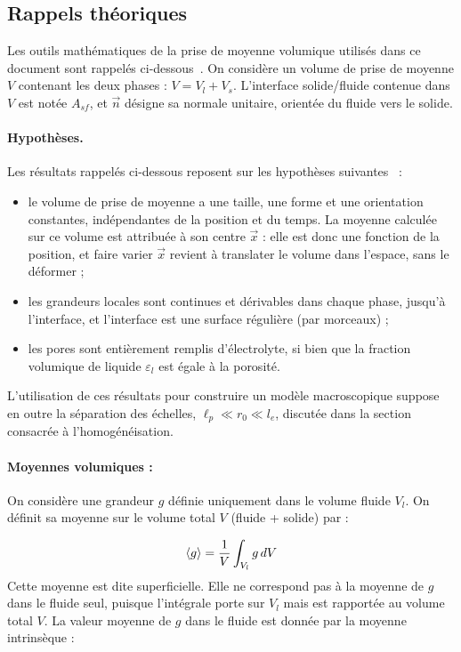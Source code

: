 \appendix

\subsection*{Rappels théoriques}

Les outils mathématiques de la prise de moyenne volumique utilisés dans ce
document sont rappelés ci-dessous~\cite{whitakerMethodVolumeAveraging1999}.
On considère un volume de prise de moyenne $V$ contenant les deux phases :
$V = V_l + V_s$. L'interface solide/fluide contenue dans $V$ est notée
$A_{sf}$, et $\vec{n}$ désigne sa normale unitaire, orientée du fluide vers le
solide.

\paragraph{Hypothèses.} Les résultats rappelés ci-dessous reposent sur les
hypothèses suivantes~\cite{whitakerMethodVolumeAveraging1999} :
\begin{itemize}
    \item le volume de prise de moyenne a une taille, une forme et une
    orientation constantes, indépendantes de la position et du temps. La
    moyenne calculée sur ce volume est attribuée à son centre $\vec{x}$ :
    elle est donc une fonction de la position, et faire varier $\vec{x}$
    revient à translater le volume dans l'espace, sans le déformer ;
    \item les grandeurs locales sont continues et dérivables dans chaque
    phase, jusqu'à l'interface, et l'interface est une surface régulière (par
    morceaux) ;
    \item les pores sont entièrement remplis d'électrolyte, si bien que la
    fraction volumique de liquide $\varepsilon_l$ est égale à la porosité.
\end{itemize}
L'utilisation de ces résultats pour construire un modèle macroscopique
suppose en outre la séparation des échelles,
$\ell_p \ll r_0 \ll l_e$, discutée dans la section consacrée à
l'homogénéisation.

\paragraph{Moyennes volumiques :}
On considère une grandeur $g$ définie uniquement dans le volume fluide $V_l$.
On définit sa moyenne sur le volume total $V$ (fluide + solide) par :

\begin{equation}
\langle g \rangle = \frac{1}{V}\int_{V_l} g\, dV \label{eq:moy_sup}
\end{equation}
Cette moyenne est dite superficielle. Elle ne correspond pas à la moyenne de $g$
dans le fluide seul, puisque l'intégrale porte sur $V_l$ mais est rapportée au
volume total $V$. La valeur moyenne de $g$ dans le fluide est donnée par la
moyenne intrinsèque :

